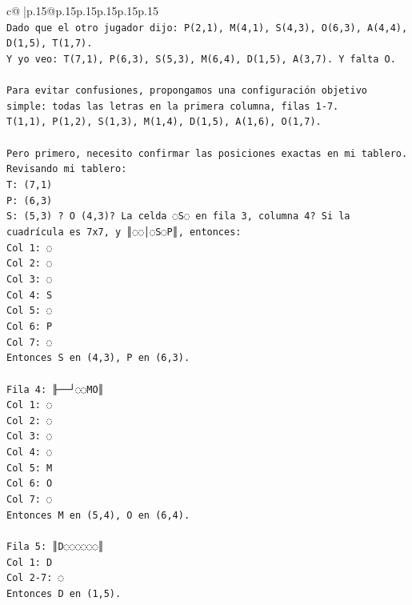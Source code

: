 \documentclass{article}
\begin{document}
{\begin{supertabular}{c@{$\;$}|p{.15\linewidth}@{}p{.15\linewidth}p{.15\linewidth}p{.15\linewidth}p{.15\linewidth}p{.15\linewidth}}
{{{\\ 
\texttt{Dado que el otro jugador dijo: P(2,1), M(4,1), S(4,3), O(6,3), A(4,4), D(1,5), T(1,7).} \\
\texttt{Y yo veo: T(7,1), P(6,3), S(5,3), M(6,4), D(1,5), A(3,7). Y falta O.} \\
\\ 
\texttt{Para evitar confusiones, propongamos una configuración objetivo simple: todas las letras en la primera columna, filas 1{-}7.} \\
\texttt{T(1,1), P(1,2), S(1,3), M(1,4), D(1,5), A(1,6), O(1,7).} \\
\\ 
\texttt{Pero primero, necesito confirmar las posiciones exactas en mi tablero.} \\
\texttt{Revisando mi tablero:} \\
\texttt{T: (7,1)} \\
\texttt{P: (6,3)} \\
\texttt{S: (5,3) ? O (4,3)? La celda ◌S◌ en fila 3, columna 4? Si la cuadrícula es 7x7, y ║◌◌│◌S◌P║, entonces:} \\
\texttt{Col 1: ◌} \\
\texttt{Col 2: ◌} \\
\texttt{Col 3: ◌} \\
\texttt{Col 4: S} \\
\texttt{Col 5: ◌} \\
\texttt{Col 6: P} \\
\texttt{Col 7: ◌} \\
\texttt{Entonces S en (4,3), P en (6,3).} \\
\\ 
\texttt{Fila 4: ╟──┘◌◌MO║} \\
\texttt{Col 1: ◌} \\
\texttt{Col 2: ◌} \\
\texttt{Col 3: ◌} \\
\texttt{Col 4: ◌} \\
\texttt{Col 5: M} \\
\texttt{Col 6: O} \\
\texttt{Col 7: ◌} \\
\texttt{Entonces M en (5,4), O en (6,4).} \\
\\ 
\texttt{Fila 5: ║D◌◌◌◌◌◌║} \\
\texttt{Col 1: D} \\
\texttt{Col 2{-}7: ◌} \\
\texttt{Entonces D en (1,5).} \\
}}}
\end{supertabular}}
\end{document}
